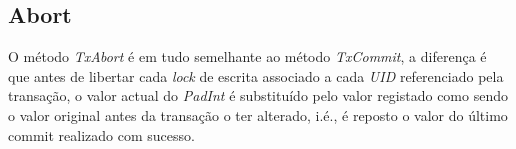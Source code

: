 \subsection{Abort}

O método \textit{TxAbort} é em tudo semelhante ao método \textit{TxCommit}, a diferença é que antes de libertar cada \textit{lock} de escrita associado a cada \textit{UID} referenciado pela transação, o valor actual do \textit{PadInt} é substituído pelo valor registado como sendo o valor original antes da transação o ter alterado, i.é., é reposto o valor do último commit realizado com sucesso. 
